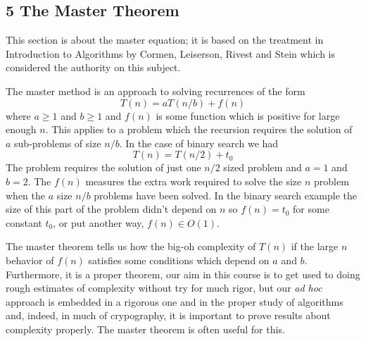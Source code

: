 \documentclass[11pt,a4paper]{scrartcl}
\begin{document}
\subsection*{5 The Master Theorem}

This section is about the master equation; it is based on the
treatment in Introduction to Algorithms by Cormen, Leiserson, Rivest
and Stein which is considered the authority on this subject.

The master method is an approach to solving recurrences of the form
\begin{equation}
T(n)=aT(n/b)+f(n)
\end{equation}
where $a\ge 1$ and $b\ge 1$ and $f(n)$ is some function which is
positive for large enough $n$. This applies to a problem which the
recursion requires the solution of $a$ sub-problems of size $n/b$. In
the case of binary search we had
\begin{equation}
T(n)=T(n/2)+t_0
\end{equation}
The problem requires the solution of just one $n/2$ sized problem and
$a=1$ and $b=2$. The $f(n)$ measures the extra work required to solve
the size $n$ problem when the $a$ size $n/b$ problems have been
solved. In the binary search example the size of this part of the
problem didn't depend on $n$ so $f(n)=t_0$ for some constant $t_0$, or put
another way, $f(n)\in O(1)$.

The master theorem tells us how the big-oh complexity of $T(n)$ if the
large $n$ behavior of $f(n)$ satisfies some conditions which depend on
$a$ and $b$. Furthermore, it is a proper theorem, our aim in this
course is to get used to doing rough estimates of complexity without
try for much rigor, but our \textsl{ad hoc} approach is embedded in a
rigorous one and in the proper study of algorithms and, indeed, in
much of crypography, it is important to prove results about complexity
properly. The master theorem is often useful for this.
\end{document}
